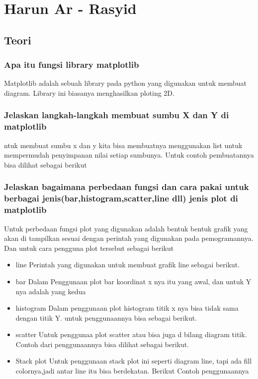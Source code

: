 \section{Harun Ar - Rasyid}
\subsection{Teori}
\subsubsection{Apa itu fungsi library matplotlib}
\hfill \break
Matplotlib adalah sebuah library pada python yang digunakan untuk membuat diagram. Library ini biasanya menghasilkan ploting 2D.
\subsubsection{Jelaskan langkah-langkah membuat sumbu X dan Y di matplotlib}
\hfill \break
ntuk membuat sumbu x dan y kita bisa membuatnya menggunakan list untuk mempermudah penyimpanan nilai setiap sumbunya.
Untuk contoh pembuatannya bisa dilihat sebagai berikut

\subsubsection{Jelaskan bagaimana perbedaan fungsi dan cara pakai untuk berbagai jenis(bar,histogram,scatter,line dll) jenis plot di matplotlib}
\hfill \break
Untuk perbedaan fungsi plot yang digunakan adalah bentuk bentuk grafik yang akan di tampilkan sesuai dengan perintah yang digunakan pada pemogramannya.
Dan untuk cara pengguna plot tersebut sebagai berikut
\begin{itemize}
    \item line
    Perintah yang digunakan untuk membuat grafik line sebagai berikut.
    
    \item bar
    Dalam Penggunaan plot bar koordinat x nya itu yang awal, dan untuk Y nya adalah yang kedua
    
    \item histogram
    Dalam penggunaan plot histogram titik x nya bisa tidak sama dengan titik Y.
    untuk penggunaannya bisa sebagai berikut.
    
    \item scatter
    Untuk penggunaa plot scatter atau bisa juga d bilang diagram titik.
    Contoh dari penggunaannya bisa dilihat sebagai berikut.
    
    \item Stack plot
    Untuk penggunaan stack plot ini seperti diagram line, tapi ada fill colornya,jadi antar line itu bisa berdekatan.
    Berikut Contoh penggunaannya
    
\end{itemize}
